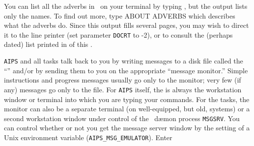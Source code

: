      You can list all the adverbs in \AIPS\ on your terminal by typing
{\us {} \CR}, but the output lists only the names.
To find out more, type {\us ABOUT \qs ADVERBS \CR} which describes
what the adverbs do.  Since this output fills several pages, you may
wish to direct it to the line printer (set parameter {\tt DOCRT} to
-2), or to consult the (perhaps dated) list printed in  of
this \Cookbook.


    {\tt AIPS} and all tasks talk back to you by writing messages to a
disk file called the ``'' and/or by sending them to
you on the appropriate ``message monitor.''  Simple instructions and
progress messages usually go only to the monitor; very few (if any)
messages go only to the file.  For {\tt AIPS} itself, the
 is always the workstation window or terminal
into which you are typing your commands.  For the tasks, the monitor
can also be a separate terminal (on well-equipped, but old, systems)
or a second workstation window under control of the \AIPS\ d\ae mon
process \hbox{{\tt MSGSRV}}.  You can control whether or not you get
the message server window by the setting of a Unix environment
variable ({\tt AIPS\_MSG\_EMULATOR}).  Enter
\btd
{}
\etd
{}

